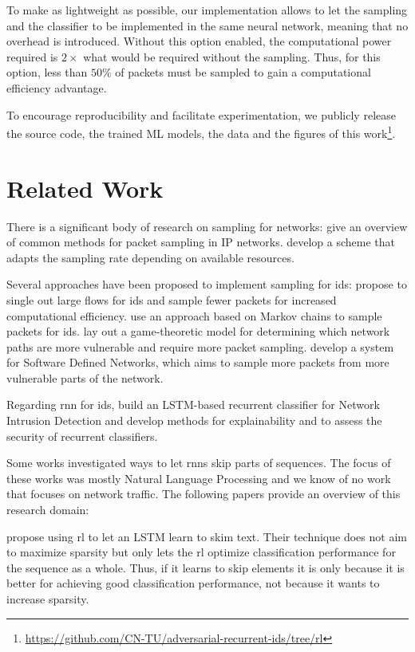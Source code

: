 \documentclass[conference]{IEEEtran}
\begin{document}
To make \ours{} as lightweight as possible, our implementation allows to let the sampling and the classifier to be implemented in the same neural network, meaning that no overhead is introduced. Without this option enabled, the computational power required is $2\times$ what would be required without the sampling. Thus, for this option, less than $50\%$ of packets must be sampled to gain a computational efficiency advantage. 

To encourage reproducibility and facilitate experimentation, we publicly release the source code, the trained ML models, the data and the figures of this work\footnote{\url{https://github.com/CN-TU/adversarial-recurrent-ids/tree/rl}}.

\section{Related Work}

There is a significant body of research on sampling for networks: \cite{zseby_sampling_2005} give an overview of common methods for packet sampling in IP networks. \cite{estan_building_2004} develop a scheme that adapts the sampling rate depending on available resources. 

Several approaches have been proposed to implement sampling for \gls{ids}:  \cite{estan_new_2003} propose to single out large flows for \gls{ids} and sample fewer packets for increased computational efficiency. \cite{bakhoum_intrusion_2011} use an approach based on Markov chains to sample packets for \gls{ids}.
\cite{murali_kodialam_detecting_2003} lay out a game-theoretic model for determining which network paths are more vulnerable and require more packet sampling. 
\cite{ha_suspicious_2016} develop a system for Software Defined Networks, which aims to sample more packets from more vulnerable parts of the network.

Regarding \gls{rnn} for \gls{ids}, \cite{hartl_explainability_2019} build an LSTM-based recurrent classifier for Network Intrusion Detection and develop methods for explainability and to assess the security of recurrent classifiers.

Some works investigated ways to let \glspl{rnn} skip parts of sequences. The focus of these works was mostly Natural Language Processing and we know of no work that focuses on network traffic. The following papers provide an overview of this research domain:

\cite{yu_learning_2017} propose using \gls{rl} to let an LSTM learn to skim text. Their technique does not aim to maximize sparsity but only lets the \gls{rl} optimize classification performance for the sequence as a whole. Thus, if it learns to skip elements it is only because it is better for achieving good classification performance, not because it wants to increase sparsity.
\end{document}
